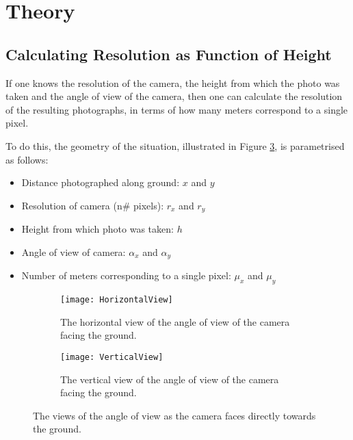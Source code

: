 \section{Theory}

\subsection{Calculating Resolution as Function of Height}

If one knows the resolution of the camera, the height from which the photo was
taken and the angle of view of the camera, then one can calculate the resolution
of the resulting photographs, in terms of how many meters correspond to a single
pixel.

To do this, the geometry of the situation, illustrated in Figure
\ref{fig:resolution-views}, is parametrised as follows:

\begin{itemize}
    \item Distance photographed along ground: $x$ and $y$
    \item Resolution of camera (n\# pixels): $r_x$ and $r_y$
    \item Height from which photo was taken: $h$
    \item Angle of view of camera: $\alpha_x$ and $\alpha_y$
    \item Number of meters corresponding to a single pixel: $\mu_x$ and $\mu_y$
\end{itemize}

\begin{figure}
    \begin{center}
        \begin{subfigure}[b]{0.49\textwidth}
            \texttt{[image: HorizontalView]}
            \caption{The horizontal view of the angle of view of the camera
            facing the ground.}
            \label{subfig:horizontal-view}
        \end{subfigure}
        \begin{subfigure}[b]{0.49\textwidth}
            \texttt{[image: VerticalView]}
            \caption{The vertical view of the angle of view of the camera facing
            the ground.}
            \label{subfig:vertical-view}
        \end{subfigure}
        \caption{The views of the angle of view as the camera faces directly
        towards the ground.}
        \label{fig:resolution-views}
    \end{center}
\end{figure}

